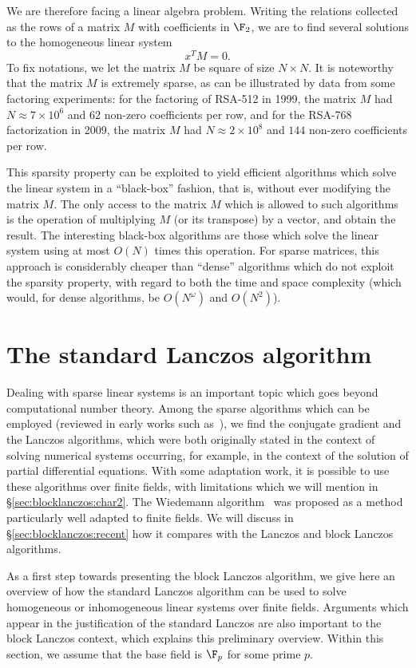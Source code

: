 We are therefore facing a linear algebra problem. Writing the relations
collected as the rows of a matrix $M$ with coefficients in $\F_2$, we are
to find several solutions to the homogeneous linear system $$x^TM=0.$$ To
fix notations, we let the matrix $M$ be square of size $N\times N$. It is
noteworthy that the matrix $M$ is extremely sparse, as can be illustrated
by data from some factoring experiments: for the factoring of RSA-512 in
1999, the matrix $M$ had $N\approx 7\times10^6$ and $62$ non-zero
coefficients per row, and for the RSA-768 factorization in 2009, the
matrix $M$ had $N\approx 2\times10^8$ and $144$ non-zero coefficients per
row.

This sparsity property can be exploited to yield efficient algorithms
which solve the linear system in a ``black-box'' fashion, that is,
without ever modifying the matrix $M$. The only access to the matrix $M$
which is allowed to such algorithms is the operation of multiplying $M$
(or its transpose) by a vector, and obtain the result. The interesting
black-box algorithms are those which solve the linear system using at
most $O(N)$ times this operation. For sparse matrices, this approach is
considerably cheaper than ``dense'' algorithms which do not exploit the
sparsity property, with regard to both the time and space complexity
(which would, for dense algorithms, be $O(N^\omega)$ and $O(N^2)$).

\section{The standard Lanczos algorithm}
\label{sec:blocklanczos:lanczos}

Dealing with sparse linear systems is an important topic which goes
beyond computational number theory.  Among the sparse algorithms which
can be employed (reviewed in early works such as~\cite{C:LaMOdl90a}), we
find the conjugate gradient and the Lanczos algorithms, which were both
originally stated in the context of solving numerical systems occurring,
for example, in the context of the solution of partial differential
equations. With some adaptation work, it is possible to use these
algorithms over finite fields, with limitations which we will
mention in §\ref{sec:blocklanczos:char2}.
The Wiedemann algorithm~\cite{Wiedemann86} was proposed as a
method particularly well adapted to finite fields. We will discuss in
§\ref{sec:blocklanczos:recent} how it
compares with the Lanczos and block Lanczos algorithms.

As a first step towards presenting the block Lanczos algorithm, we give
here an overview of how the standard Lanczos algorithm can be used to
solve homogeneous or inhomogeneous linear systems over finite fields.
Arguments which appear in the justification of the standard Lanczos are
also important to the block Lanczos context, which explains this
preliminary overview.  Within this section, we assume that the base field
is $\F_p$ for some prime $p$.

